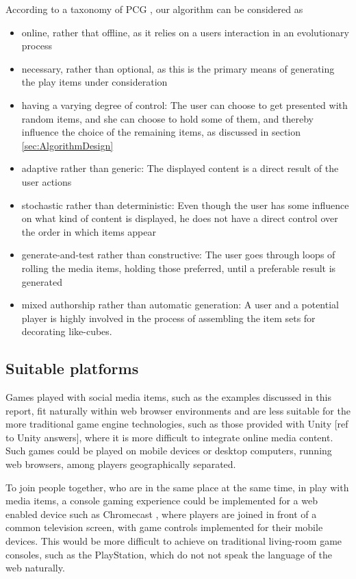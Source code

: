 \documentclass[]{article}
\begin{document}
According to a taxonomy of PCG \cite{togelius2014introduction}, our algorithm can be considered as
\begin{itemize}
	\item online, rather that offline, as it relies on a users interaction in an evolutionary process
	\item necessary, rather than optional, as this is the primary means of generating the play items under consideration
	\item having a varying degree of control:  The user can choose to get presented with random items, and she can choose to hold some of them, and thereby influence the choice of the remaining items, as discussed in section \ref{sec:AlgorithmDesign}
	\item adaptive rather than generic:  The displayed content is a direct result of the user actions
	\item stochastic rather than deterministic:  Even though the user has some influence on what kind of content is displayed, he does not have a direct control over the order in which items appear
	\item generate-and-test rather than constructive:  The user goes through loops of rolling the media items, holding those preferred, until a preferable result is generated
	\item mixed authorship rather than automatic generation:  A user and a potential player is highly involved in the process of assembling the item sets for decorating like-cubes.
\end{itemize}


\subsection{Suitable platforms}

Games played with social media items, such as the examples discussed in this report, fit naturally within web browser environments and are less suitable for the more traditional game engine technologies, such as those provided with Unity [ref to Unity answers], where it is more difficult to integrate online media content.  Such games could be played on mobile devices or desktop computers, running web browsers, among players geographically separated.  

To join people together, who are in the same place at the same time, in play with media items, a console gaming experience could be implemented for a web enabled device such as Chromecast \cite{ChromecastGames}, where players are joined in front of a common television screen, with game controls implemented for their mobile devices.  This would be more difficult to achieve on traditional living-room game consoles, such as the PlayStation, which do not not speak the language of the web naturally.
\end{document}
